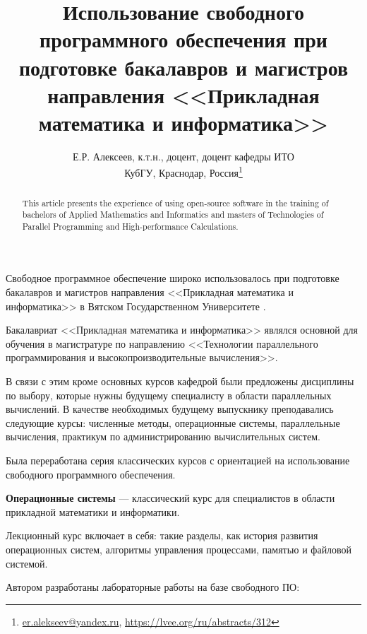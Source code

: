 \documentclass[10pt, a5paper]{article}
\begin{document}
\title{Использование свободного программного обеспечения при подготовке бакалавров и магистров направления <<Прикладная математика и информатика>>}
\author{Е.Р. Алексеев, к.т.н., доцент, доцент кафедры ИТО \\ КубГУ, Краснодар, Россия\footnote{\url{ er.alekseev@yandex.ru}, \url {https://lvee.org/ru/abstracts/312}}}
\maketitle
\begin{abstract}
This article presents the experience of using open-source software in the training of bachelors of Applied Mathematics and \linebreak Informatics and masters of Technologies of Parallel Programming and High-performance Calculations.
\end{abstract}
Свободное программное обеспечение широко использовалось при подготовке бакалавров и магистров направления <<Прикладная математика и информатика>> в Вятском Государственном Университете \cite{bib1}.

Бакалавриат <<Прикладная математика и информатика>> являлся основной для обучения в магистратуре по направлению <<Технологии параллельного программирования и высокопроизводительные вычисления>>.

В связи с этим кроме основных курсов кафедрой были предложены дисциплины по выбору, которые нужны будущему специалисту в области параллельных вычислений. В качестве необходимых будущему выпускнику преподавались следующие курсы: численные методы, операционные системы, параллельные вычисления, практикум по администрированию вычислительных систем.

Была переработана серия классических курсов с ориентацией на использование свободного программного обеспечения.

\textbf{Операционные системы} --- классический курс для специалистов в области прикладной математики и информатики.

Лекционный курс включает в себя: такие разделы, как история развития операционных систем, алгоритмы управления процессами, памятью и файловой системой.

Автором разработаны лабораторные работы на базе свободного ПО:
\end{document}
